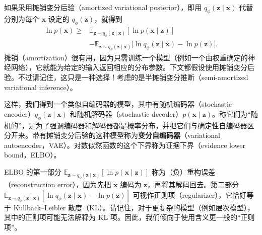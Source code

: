 如果采用摊销变分后验（amortized variational posterior），即用 $q_\phi(\mathbf{z}\mid\mathbf{x})$ 代替分别为每个 $\mathbf{x}$ 设定的 $q_\phi(\mathbf{z})$，就得到
\begin{equation}
\begin{aligned}
\ln p(\mathbf{x})\geq{}&\mathbb{E}_{\mathbf{z}\sim q_\phi(\mathbf{z}\mid\mathbf{x})}[\ln p(\mathbf{x}\mid\mathbf{z})]\\
 &-\mathbb{E}_{\mathbf{z}\sim q_\phi(\mathbf{z}\mid\mathbf{x})}
      \bigl[\ln q_\phi(\mathbf{z}\mid\mathbf{x})-\ln p(\mathbf{z})\bigr].
\end{aligned}
\tag{5.17}\label{eq:05-17}
\end{equation}
摊销（amortization）很有用，因为只需训练一个模型（例如一个由权重确定的神经网络），它就能为给定的输入返回相应的分布参数。下文都假设使用摊销变分后验。不过请记住，这只是一种选择！考虑的是半摊销变分推断（semi-amortized variational inference）。

这样，我们得到一个类似自编码器的模型，其中有随机编码器（stochastic encoder）$q_\phi(\mathbf{z}\mid\mathbf{x})$ 和随机解码器（stochastic decoder）$p(\mathbf{x}\mid\mathbf{z})$。称它们为“随机的”，是为了强调编码器和解码器都是概率分布，并把它们与确定性自编码器区分开来。带有摊销变分后验的这种模型称为\textbf{变分自编码器}（variational autoencoder，VAE）。对数似然函数的这个下界称为证据下界（evidence lower bound，ELBO）。

ELBO 的第一部分 $\mathbb{E}_{\mathbf{z}\sim q_\phi(\mathbf{z}\mid\mathbf{x})}[\ln p(\mathbf{x}\mid\mathbf{z})]$ 称为（负）重构误差（reconstruction error），因为先把 $\mathbf{x}$ 编码为 $\mathbf{z}$，再将其解码回去。第二部分 $\mathbb{E}_{\mathbf{z}\sim q_\phi(\mathbf{z}\mid\mathbf{x})}[\ln q_\phi(\mathbf{z}\mid\mathbf{x})-\ln p(\mathbf{z})]$ 可视作正则项（regularizer），它恰好等于 Kullback–Leibler 散度（KL）。请记住，对于更复杂的模型（例如层次模型），其中的正则项可能无法解释为 KL 项。因此，我们倾向于使用含义更一般的“正则项”。

